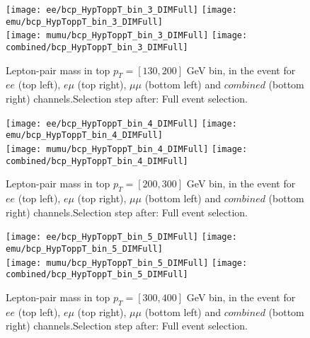 \documentclass[12pt, a4paper, titlepage]{article}
\begin{document}
\clearpage
\newpage


\begin{figure}
  \texttt{[image: ee/bcp\_HypToppT\_bin\_3\_DIMFull]}
  \texttt{[image: emu/bcp\_HypToppT\_bin\_3\_DIMFull]}\\
  \texttt{[image: mumu/bcp\_HypToppT\_bin\_3\_DIMFull]}
  \texttt{[image: combined/bcp\_HypToppT\_bin\_3\_DIMFull]}
\caption{Lepton-pair mass in top $p_T = [130,200]$ GeV bin, in the event for $ee$ (top left), $e\mu$ (top right), $\mu\mu$ (bottom left) and $combined$ (bottom right) channels.\newline Selection step after: Full event selection.}
\end{figure}

\clearpage
\newpage

\begin{figure}
  \texttt{[image: ee/bcp\_HypToppT\_bin\_4\_DIMFull]}
  \texttt{[image: emu/bcp\_HypToppT\_bin\_4\_DIMFull]}\\
  \texttt{[image: mumu/bcp\_HypToppT\_bin\_4\_DIMFull]}
  \texttt{[image: combined/bcp\_HypToppT\_bin\_4\_DIMFull]}
\caption{Lepton-pair mass in top $p_T = [200,300]$ GeV bin, in the event for $ee$ (top left), $e\mu$ (top right), $\mu\mu$ (bottom left) and $combined$ (bottom right) channels.\newline Selection step after: Full event selection.}
\end{figure}

\clearpage
\newpage


\begin{figure}
  \texttt{[image: ee/bcp\_HypToppT\_bin\_5\_DIMFull]}
  \texttt{[image: emu/bcp\_HypToppT\_bin\_5\_DIMFull]}\\
  \texttt{[image: mumu/bcp\_HypToppT\_bin\_5\_DIMFull]}
  \texttt{[image: combined/bcp\_HypToppT\_bin\_5\_DIMFull]}
\caption{Lepton-pair mass in top $p_T = [300,400]$ GeV bin, in the event for $ee$ (top left), $e\mu$ (top right), $\mu\mu$ (bottom left) and $combined$ (bottom right) channels.\newline Selection step after: Full event selection.}
\end{figure}

\clearpage
\newpage
\end{document}

